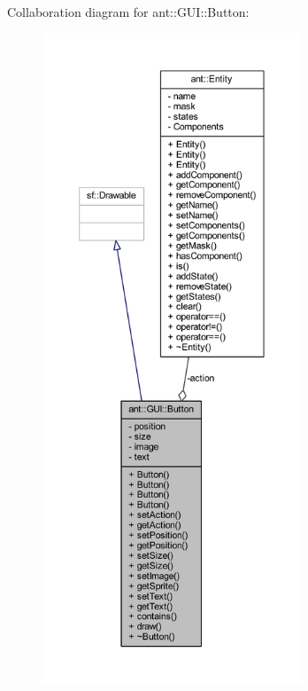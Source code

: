 Collaboration diagram for ant\+:\+:G\+U\+I\+:\+:Button\+:
\nopagebreak
\begin{figure}[H]
\begin{center}
\leavevmode
\includegraphics[height=550pt]{d5/d74/classant_1_1_g_u_i_1_1_button__coll__graph}
\end{center}
\end{figure}
